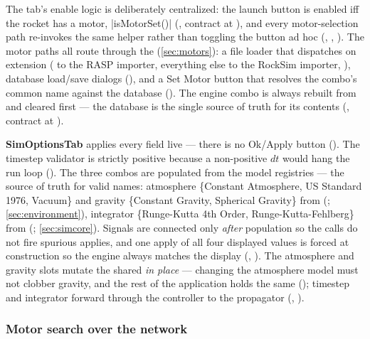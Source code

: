 The tab's enable logic is deliberately centralized: the launch button is enabled iff the
rocket has a motor, \cppinline|isMotorSet()| (, contract at
), and every motor-selection path re-invokes the same helper
rather than toggling the button ad hoc (,
, ). The motor paths all
route through the  (\cref{sec:motors}): a file loader that
dispatches on extension ( to the RASP importer, everything else to the RockSim
 importer, ),  database load/save
dialogs (), and a Set Motor button that resolves the combo's
common name against the database (). The engine combo is
always rebuilt from  and cleared first --- the database is the single
source of truth for its contents (, contract at
).

\textbf{SimOptionsTab} applies every field live --- there is no Ok/Apply button
(). The timestep validator is strictly positive because a
non-positive $dt$ would hang the run loop (). The three
combos are populated from the model registries --- the source of truth for valid names:
atmosphere \{Constant Atmosphere, US Standard 1976, Vacuum\} and gravity \{Constant
Gravity, Spherical Gravity\} from  (;
\cref{sec:environment}), integrator \{Runge-Kutta 4th Order, Runge-Kutta-Fehlberg\} from
 (; \cref{sec:simcore}). Signals are
connected only \emph{after} population so the  calls do not fire spurious
applies, and one apply of all four displayed values is forced at construction so the engine
always matches the display (,
). The atmosphere and gravity slots mutate the shared
 \emph{in place} --- changing the atmosphere model must not clobber
gravity, and the rest of the application holds the same 
(); timestep and integrator forward through the controller to
the propagator (, ).

\subsubsection{Motor search over the network}\label{sec:interfaces-gui-motorsearch}

